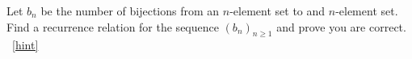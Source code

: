 \documentclass{book}
\begin{document}
\setcounter{project}{136}
\addtocounter{project}{-1}
\begin{activity}[]\label{activity-129}
\hypertarget{p-948}{}%
Let \(b_n\) be the number of bijections from an \(n\)-element set to and \(n\)-element set.  Find a recurrence relation for the sequence \((b_n)_{n \ge 1}\) and prove you are correct.%
~\hfill{\tiny\hyperlink{a-136}{[hint]}\hypertarget{q-136}{}}\end{activity}
\end{document}
